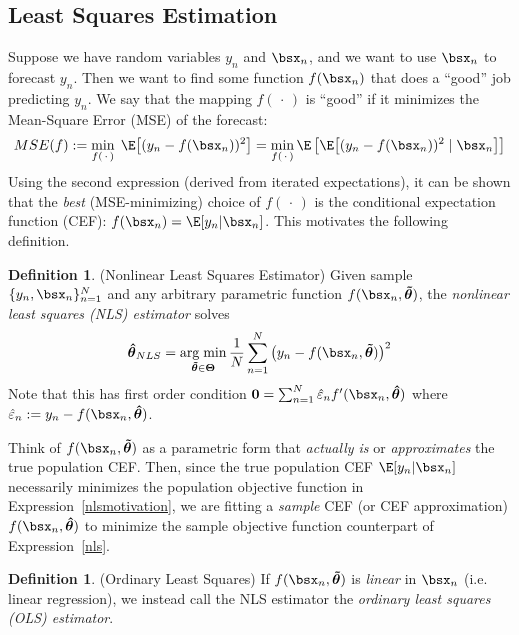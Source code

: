 \documentclass[12pt]{article}
\theoremstyle{plain}
\theoremstyle{definition}
\newtheorem{defn}[thm]{Definition}
\theoremstyle{remark}
\newcommand{\bsTheta}{\boldsymbol{\Theta}}
\newcommand{\bshattheta}{\boldsymbol{\hat{\theta}}}
\newcommand{\bstildetheta}{\boldsymbol{\tilde{\theta}}}
\renewcommand{\bso}{\boldsymbol{0}}
\DeclareMathOperator*{\argmin}{arg\;min}
\newcommand{\sumnN}{\sum^N_{n=1}}
\newcommand{\nN}{_{n=1}^N}
\begin{document}
\clearpage
\subsection{Least Squares Estimation}

Suppose we have random variables $y_n$ and $\bsx_n$, and we want to use
$\bsx_n$ to forecast $y_n$. Then we want to find some function
$f(\bsx_n)$ that does a ``good'' job predicting $y_n$. We say that
the mapping $f(\,\cdot\,)$ is ``good'' if it minimizes the Mean-Square
Error (MSE) of the forecast:
\begin{align}
  MSE(f)
  :=
  \min_{f(\,\cdot\,)} \; \E\big[(y_n - f(\bsx_n))^2\big]
  =
  \min_{f(\,\cdot\,)}
  \E\left[\E\big[(y_n - f(\bsx_n))^2 \;|\;\bsx_n\big]\right]
  \label{nlsmotivation}
\end{align}
Using the second expression (derived from iterated expectations), it can be
shown that the \emph{best} (MSE-minimizing) choice of $f(\,\cdot\,)$ is
the conditional expectation function (CEF): $f(\bsx_n)=\E[y_n|\bsx_n]$.
This motivates the following definition.

\begin{defn}(Nonlinear Least Squares Estimator)
Given sample $\{y_n,\bsx_n\}\nN$ and any arbitrary parametric function
$f(\bsx_n,\bstildetheta)$, the
\emph{nonlinear least squares (NLS) estimator} solves
\begin{align}
  \bshattheta_{NLS}
  = \argmin_{\bstildetheta\in\bsTheta}
  \frac{1}{N}\sumnN \big(y_n-f(\bsx_n,\bstildetheta)\big)^2
  \label{nls}
\end{align}
Note that this has first order condition
$\bso = \sumnN \hat{\varepsilon}_n f'(\bsx_n,\bshattheta)$
where $\hat{\varepsilon}_n := y_n-f(\bsx_n,\bshattheta)$.

Think of $f(\bsx_n,\bstildetheta)$ as a parametric form that
\emph{actually is} or \emph{approximates} the true population CEF.
Then, since the true population CEF $\E[y_n|\bsx_n]$ necessarily
minimizes the population objective function in
Expression~\ref{nlsmotivation}, we are fitting a \emph{sample} CEF (or
CEF approximation) $f(\bsx_n,\bshattheta)$ to minimize the sample
objective function counterpart of Expression~\ref{nls}.
\end{defn}

\begin{defn}(Ordinary Least Squares)
If $f(\bsx_n,\bstildetheta)$ is \emph{linear} in $\bsx_n$ (i.e.  linear
regression), we instead call the NLS estimator the
\emph{ordinary least squares (OLS) estimator}.
\end{defn}
\end{document}
